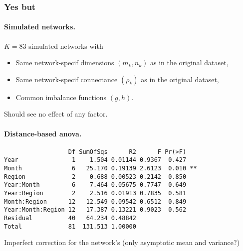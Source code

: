 \documentclass[8pt]{beamer}
\begin{document}
\begin{frame}[fragile] \frametitle{Yes but}

  \paragraph{Simulated networks.} $K = 83$ simulated networks with
  \begin{itemize}
    \item Same network-specif dimensions $(m_k, n_k)$ as in the original dataset,
    \item Same network-specif connectance $(\rho_k)$ as in the original dataset,
    \item Common imbalance functions $(g, h)$.
  \end{itemize}
  \ra Should see no effect of any factor.
  
  \bigskip \pause
  \paragraph{Distance-based anova.} {\small  
\begin{verbatim}
                  Df SumOfSqs      R2      F Pr(>F)   
Year               1    1.504 0.01144 0.9367  0.427   
Month              6   25.170 0.19139 2.6123  0.010 **
Region             2    0.688 0.00523 0.2142  0.850   
Year:Month         6    7.464 0.05675 0.7747  0.649   
Year:Region        2    2.516 0.01913 0.7835  0.581   
Month:Region      12   12.549 0.09542 0.6512  0.849   
Year:Month:Region 12   17.387 0.13221 0.9023  0.562   
Residual          40   64.234 0.48842                 
Total             81  131.513 1.00000                 
\end{verbatim} }

  \bigskip \pause
  \ra Imperfect correction for the network's  (only asymptotic mean and variance?)

\end{frame}
\end{document}
